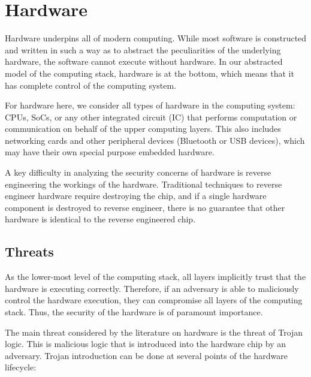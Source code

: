 \documentclass[11pt,letterpaper]{article}
\begin{document}
\section{Hardware}

Hardware underpins all of modern computing. While most software is
constructed and written in such a way as to abstract the
peculiarities of the underlying hardware, the software cannot
execute without hardware. In our abstracted model of the computing
stack, hardware is at the bottom, which means that it has complete
control of the computing system.

For hardware here, we consider all types of hardware in the computing
system: CPUs, SoCs, or any other integrated circuit (IC) that performs
computation or communication on behalf of the upper computing layers.
This also includes networking cards and other peripheral devices
(Bluetooth or USB devices), which may have their own special purpose
embedded hardware.

A key difficulty in analyzing the security concerns of hardware is
reverse engineering the workings of the hardware. Traditional
techniques to reverse engineer hardware require destroying the chip,
and if a single hardware component is destroyed to reverse engineer,
there is no guarantee that other hardware is identical to the reverse
engineered chip.

\subsection{Threats}

As the lower-most level of the computing stack, all layers implicitly
trust that the hardware is executing correctly. Therefore, if an
adversary is able to maliciously control the hardware execution, they
can compromise all layers of the computing stack. Thus, the security
of the hardware is of paramount importance.

The main threat considered by the literature on hardware is the threat
of Trojan logic. This is malicious logic that is introduced into the
hardware chip by an adversary. Trojan introduction can be
done at several points of the hardware lifecycle:
\end{document}
